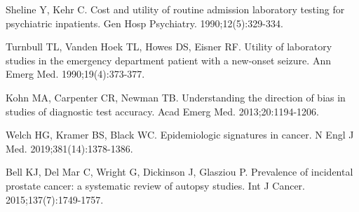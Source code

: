 \begin{references}
\item Sheline Y, Kehr C. Cost and utility of routine admission laboratory testing for psychiatric inpatients. Gen Hosp Psychiatry. 1990;12(5):329-334.
\item Turnbull TL, Vanden Hoek TL, Howes DS, Eisner RF. Utility of laboratory studies in the emergency department patient with a new-onset seizure. Ann Emerg Med. 1990;19(4):373-377.
\item Kohn MA, Carpenter CR, Newman TB. Understanding the direction of bias in studies of diagnostic test accuracy. Acad Emerg Med. 2013;20:1194-1206.
\item Welch HG, Kramer BS, Black WC. Epidemiologic signatures in cancer. N Engl J Med. 2019;381(14):1378-1386.
\item Bell KJ, Del Mar C, Wright G, Dickinson J, Glasziou P. Prevalence of incidental prostate cancer: a systematic review of autopsy studies. Int J Cancer. 2015;137(7):1749-1757.
\end{references}
